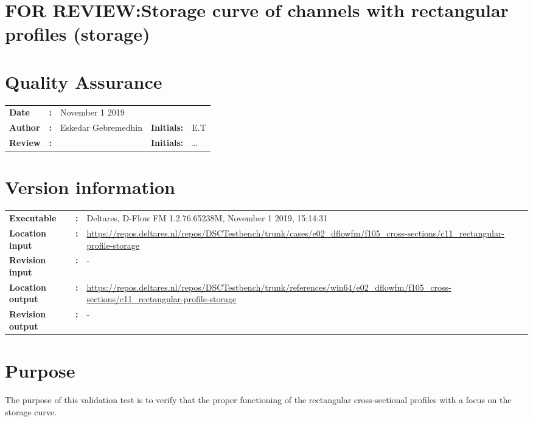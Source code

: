 

\section{FOR REVIEW:Storage curve of channels with rectangular profiles (storage)}
\newrefsegment

\section*{Quality Assurance}
\begin{tabular}{@{}p{27mm}@{}p{0mm}p{\textwidth-52mm-48pt}p{15mm}p{10mm}}
\textbf{Date} & \textbf{:} &   November 1 2019\\ 
\textbf{Author} & \textbf{:} & Eskedar Gebremedhin  & \textbf{Initials:} & E.T \\
\textbf{Review} & \textbf{:} &   & \textbf{Initials:} & \ldots 
\end{tabular}

\section*{Version information}
{{
\begin{tabular}{@{}p{27mm}@{}p{0mm}p{\textwidth-27mm-24pt}}
\textbf{Executable}   & \textbf{:} & Deltares, D-Flow FM 1.2.76.65238M, November 1 2019, 15:14:31  \\
\textbf{Location input}     & \textbf{:} & \url{https://repos.deltares.nl/repos/DSCTestbench/trunk/cases/e02_dflowfm/f105_cross-sections/c11_rectangular-profile-storage} \\
\textbf{Revision input} & \textbf{:} & - \\
\textbf{Location output}     & \textbf{:} & \url{https://repos.deltares.nl/repos/DSCTestbench/trunk/references/win64/e02_dflowfm/f105_cross-sections/c11_rectangular-profile-storage} \\
\textbf{Revision output} & \textbf{:} & -
\end{tabular}
}}

\section*{Purpose}
The purpose of this validation test is to verify that the proper functioning of the rectangular cross-sectional profiles with a focus on the storage curve.

